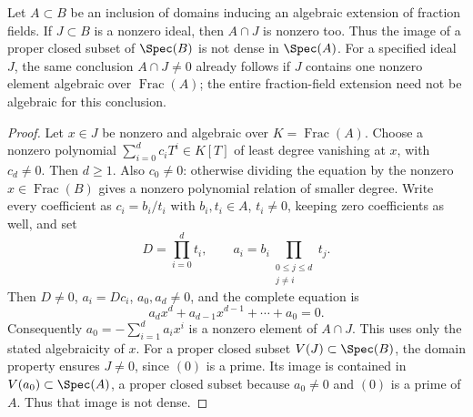 \begin{lemma}
\label{lemma-intersection-not-zero}
Let $A \subset B$ be an inclusion of domains inducing an algebraic extension
of fraction fields. If $J \subset B$ is a nonzero ideal, then $A \cap J$
is nonzero too. Thus the image of a proper closed subset of $\Spec(B)$
is not dense in $\Spec(A)$.
For a specified ideal $J$, the same conclusion $A\cap J\ne0$ already
follows if $J$ contains one nonzero element algebraic over
$\operatorname{Frac}(A)$; the entire fraction-field extension need
not be algebraic for this conclusion.
\end{lemma}

\begin{proof}
Let $x\in J$ be nonzero and algebraic over $K=\operatorname{Frac}(A)$.
Choose a nonzero polynomial $\sum_{i=0}^dc_iT^i\in K[T]$ of least
degree vanishing at $x$, with $c_d\ne0$. Then $d\geq1$.
Also $c_0\ne0$: otherwise dividing the equation by the nonzero
$x\in\operatorname{Frac}(B)$ gives a nonzero polynomial relation
of smaller degree. Write every coefficient as $c_i=b_i/t_i$ with
$b_i,t_i\in A$, $t_i\ne0$, keeping zero coefficients as well, and set
$$
D=\prod_{i=0}^dt_i,\qquad
a_i=b_i\prod_{\substack{0\leq j\leq d\\j\ne i}}t_j.
$$
Then $D\ne0$, $a_i=Dc_i$, $a_0,a_d\ne0$, and the complete equation is
$$
a_dx^d+a_{d-1}x^{d-1}+\cdots+a_0=0.
$$
Consequently $a_0=-\sum_{i=1}^d a_ix^i$ is a nonzero element of
$A\cap J$. This uses only the stated algebraicity of $x$.
For a proper closed subset $V(J)\subset\Spec(B)$, the domain property
ensures $J\ne0$, since $(0)$ is a prime. Its image is contained in
$V(a_0)\subset\Spec(A)$, a proper closed subset because
$a_0\ne0$ and $(0)$ is a prime of $A$. Thus that image is not dense.
\end{proof}